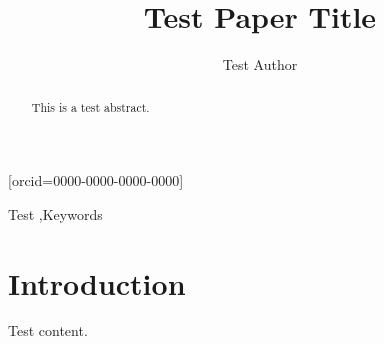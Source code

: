 \documentclass[a4paper,fleqn]{cas-dc}
\begin{document}
\let\WriteBookmarks\relax
\def\floatpagepagefraction{1}
\def\textpagefraction{.001}


\title[mode=title]{Test Paper Title}

\author[1]{Test Author}[orcid=0000-0000-0000-0000]


\begin{abstract}
This is a test abstract.
\end{abstract}

\begin{keywords}
Test \sep Keywords
\end{keywords}

\maketitle

\section{Introduction}
Test content.
\end{document}
